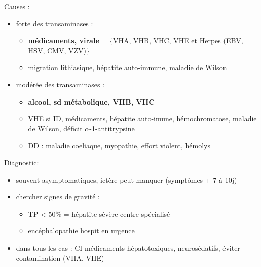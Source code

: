 \documentclass[11pt]{article}
\begin{document}
Causes :
\begin{itemize}
\item \inc{} forte des transaminases : 
\begin{itemize}
\item \textbf{médicaments, virale} = \{VHA, VHB, VHC, VHE et Herpes (EBV, HSV, CMV, VZV)\}
\item migration lithiasique, hépatite auto-immune, maladie de Wilson
\end{itemize}
\item \inc{} modérée des transaminases : 
\begin{itemize}
\item \textbf{alcool, sd métabolique, VHB, VHC}
\item VHE si \gls{ID}, médicaments, hépatite auto-imune, hémochromatose, maladie de
Wilson, déficit \(\alpha\)-1-antitrypsine
\item DD : maladie coeliaque, myopathie, effort violent, hémolys
\end{itemize}
\end{itemize}

Diagnostic: 
\begin{itemize}
\item souvent asymptomatiques, ictère peut manquer (symptômes + 7 à 10j)
\item chercher signes de gravité : 
\begin{itemize}
\item TP < 50\% = hépatite sévère \thus centre spécialisé
\item encéphalopathie \thus hospit en urgence \faBomb
\end{itemize}
\item dans tous les cas : CI médicaments hépatotoxiques, neurosédatifs, éviter
contamination (VHA, VHE)
\end{itemize}





\begin{table}
\caption{Hépatites virales, résumé}
\label{tab:my-table}
\centering
{}
\end{table}
\end{document}
